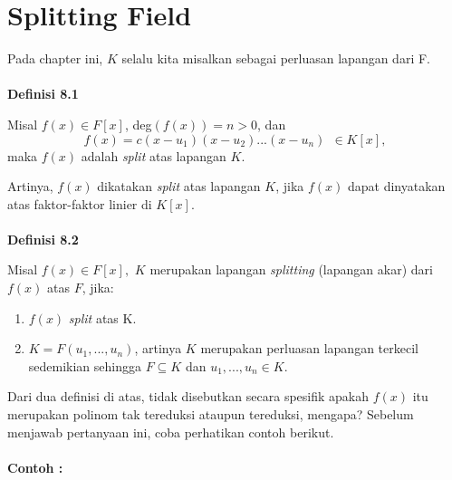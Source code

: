 

\chapter{Splitting Field}
	Pada chapter ini, $K$ selalu kita misalkan sebagai perluasan lapangan dari F.
\\
\\	\textbf{Definisi 8.1}
\par 	Misal $f(x) \in F[x]$, deg$(f(x))=n>0$, dan $$f(x)=c(x-u_1)(x-u_2)...(x-u_n)~~\in K[x],$$ maka $f(x)$ adalah \textit{split} atas lapangan $K$.
\\
\par 	Artinya, $f(x)$ dikatakan \textit{split} atas lapangan $K$, jika $f(x)$ dapat dinyatakan atas faktor-faktor linier di $K[x]$.
\\
\\
	\textbf{Definisi 8.2}
\par 	Misal $f(x) \in F[x],$ $K$ merupakan lapangan \textit{splitting} (lapangan akar) dari $f(x)$ atas $F$, jika:
	\begin{enumerate}	
	\renewcommand{\labelenumi}
	{\roman{enumi}}
	\item $f(x)$ \textit{split} atas K.
	\item $K = F(u_1,...,u_n)$, artinya $K$ merupakan perluasan lapangan terkecil sedemikian sehingga $F\subseteq K$ dan $u_1,...,u_n \in K.$
	\end{enumerate}
\par 	Dari dua definisi di atas, tidak disebutkan secara spesifik apakah $f(x)$ itu merupakan polinom tak tereduksi ataupun tereduksi, mengapa? Sebelum menjawab pertanyaan ini, coba perhatikan contoh berikut.
\\
\\
	\textbf{Contoh :}
